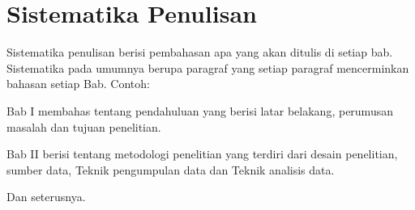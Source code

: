 \section{Sistematika Penulisan}

Sistematika penulisan berisi pembahasan apa yang akan ditulis di setiap bab. 
Sistematika pada umumnya berupa paragraf yang setiap paragraf mencerminkan 
bahasan setiap Bab. Contoh:

\noindent Bab I membahas tentang pendahuluan yang berisi latar belakang, perumusan masalah 
dan tujuan penelitian. 

\noindent Bab II berisi tentang metodologi penelitian yang terdiri dari desain penelitian, sumber data, Teknik pengumpulan data dan Teknik analisis data.

\noindent Dan seterusnya.

